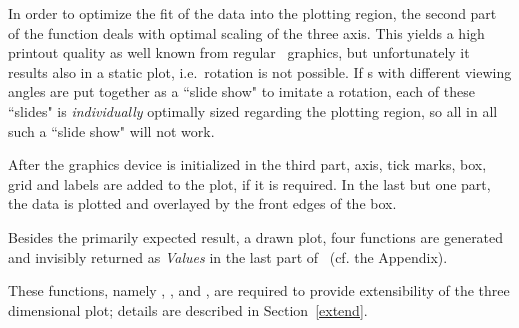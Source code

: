 In order to optimize the fit of the data into the plotting region, the second part of the function deals
with optimal scaling of the three axis.
This yields a high printout quality as well known from regular \RR\ graphics,
but unfortunately it results also in a static plot, i.e.~rotation is not possible.
If \sdd s with different viewing angles are put together as a ``slide show" to imitate a rotation,
each of these ``slides" is {\sl individually} optimally sized regarding the plotting region,
so all in all such a ``slide show" will not work.

After the graphics device is initialized in the third part, axis, tick marks, box, grid and labels are added
to the plot, if it is required.
In the last but one part, the data is plotted and overlayed by the front edges of the box.

Besides the primarily expected result, a drawn plot, four functions are generated and invisibly returned as
\emph{Values} in the last part of \sdd\ (cf. the Appendix).

These functions, namely , , 
and , are required to provide extensibility of the three
dimensional plot; details are described in Section~\ref{extend}.

